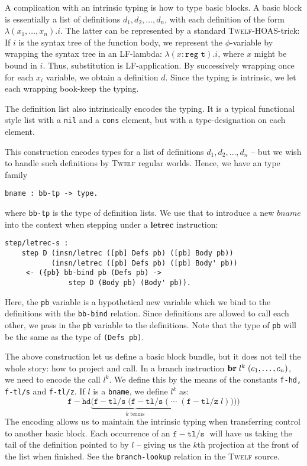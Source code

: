 \documentclass[a4paper, oneside, 10pt, draft]{memoir}
\newcommand{\twelf}{\textsc{Twelf}}
\begin{document}
A complication with an intrinsic typing is how to type basic blocks. A
basic block is essentially a list of definitions $d_1, d_2, \dotsc,
d_n$, with each definition of the form $\lambda (x_1, \dotsc,
x_n).i$. The latter can be represented by a standard \twelf{}-HOAS-trick:
If $i$ is the syntax tree of the function body, we represent the
$\phi$-variable by wrapping the syntax tree in an LF-lambda: $\lambda
(x : \texttt{reg t}) . i$, where $x$ might be bound in $i$. Thus,
substitution is LF-application. By successively wrapping once for each
$x_i$ variable, we obtain a definition $d$. Since the typing is
intrinsic, we let each wrapping book-keep the typing.

The definition list also intrinsically encodes the typing. It is a
typical functional style list with a \texttt{nil} and a \texttt{cons}
element, but with a type-designation on each element.

This construction encodes types for a list of definitions $d_1, d_2,
\dotsc, d_n$ -- but we wish to handle such definitions by \twelf{}
regular worlds. Hence, we have an type family
\begin{verbatim}
bname : bb-tp -> type.
\end{verbatim}
where \texttt{bb-tp} is the type of definition lists. We use that to
introduce a new $bname$ into the context when stepping under a
$\mathbf{letrec}$ instruction:
\begin{verbatim}
step/letrec-s :
    step D (insn/letrec ([pb] Defs pb) ([pb] Body pb))
           (insn/letrec ([pb] Defs pb) ([pb] Body' pb))
     <- ({pb} bb-bind pb (Defs pb) ->
               step D (Body pb) (Body' pb)).
\end{verbatim}
Here, the \texttt{pb} variable is a hypothetical new variable which we
bind to the definitions with the \texttt{bb-bind} relation. Since
definitions are allowed to call each other, we pass in the \texttt{pb}
variable to the definitions. Note that the type of \texttt{pb} will be
the same as the type of \texttt{(Defs pb)}.

The above construction let us define a basic block bundle, but it does
not tell the whole story: how to project and call. In a branch
instruction $\mathbf{br} \; l^k \; (c_1, \dotsc, c_n)$, we need to encode the
call $l^k$. We define this by the means of the constants
\texttt{f-hd, f-tl/s} and \texttt{f-tl/z}. If $l$ is a
\texttt{bname}, we define $l^k$ as:
\newcommand{\fhd}{\mathtt{f\!\!-\!\!hd}}
\newcommand{\ftls}{\mathtt{f\!\!-\!\!tl/s}\; }
\newcommand{\ftlz}[1]{(\mathtt{f\!\!-\!\!tl/z} \; #1)}
\begin{equation*}
  \fhd \underbrace{(\ftls(\ftls ( \; \dotsb \; }_{k \; \text{terms}}\ftlz{l})))
\end{equation*}
The encoding allows us to maintain the intrinsic typing when transferring
control to another basic block. Each occurrence of an $\ftls$ will
have us taking the tail of the definition pointed to by $l$ -- giving
us the $k$th projection at the front of the list when finished. See
the \texttt{branch-lookup} relation in the \twelf{} source.
\end{document}
